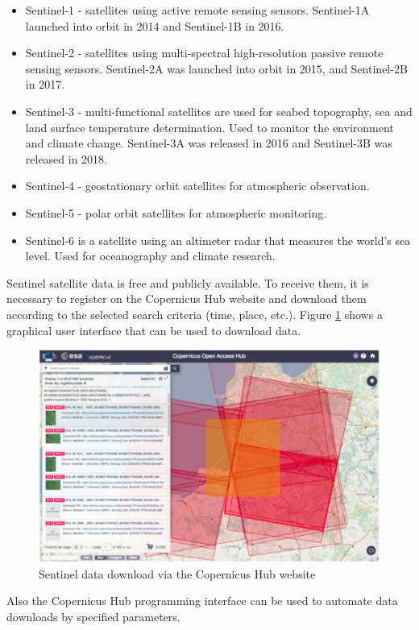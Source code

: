 \begin{itemize}
	\item Sentinel-1 - satellites using active remote sensing sensors. Sentinel-1A launched into orbit in 2014 and Sentinel-1B in 2016.
	\item Sentinel-2 - satellites using multi-spectral high-resolution passive remote sensing sensors. Sentinel-2A was launched into orbit in 2015, and Sentinel-2B in 2017.
	\item Sentinel-3 - multi-functional satellites are used for seabed topography, sea and land surface temperature determination. Used to monitor the environment and climate change. Sentinel-3A was released in 2016 and Sentinel-3B was released in 2018.
	\item Sentinel-4 - geostationary orbit satellites for atmospheric observation.
	\item Sentinel-5 - polar orbit satellites for atmospheric monitoring.
	\item Sentinel-6 is a satellite using an altimeter radar that measures the world's sea level. Used for oceanography and climate research.
\end{itemize}

	Sentinel satellite data is free and publicly available. To receive them, it is necessary to register on the Copernicus Hub website and download them according to the selected search criteria (time, place, etc.). Figure \ref{fig:copernicus_hub} shows a graphical user interface that can be used to download data.

\begin{figure}[H]
	\centering
	\includegraphics[width=0.8\linewidth]{images/copernicus_hub.png}
	\caption{Sentinel data download via the Copernicus Hub website}
	\label{fig:copernicus_hub}
\end{figure}

	Also the Copernicus Hub programming interface can be used to automate data downloads by specified parameters.
	

